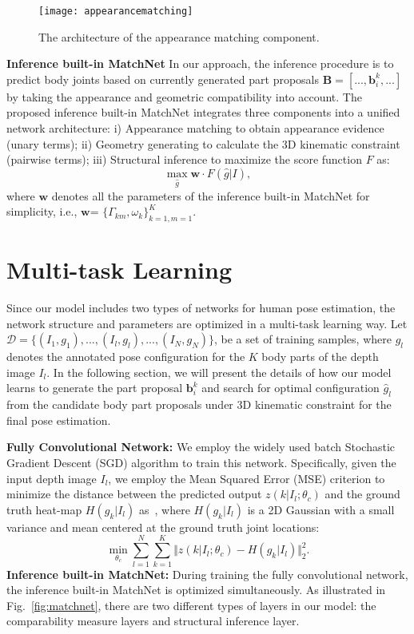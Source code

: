 \documentclass{sig-alternate-05-2015}
\begin{document}
\begin{figure*}[!htb]
\centering
\texttt{[image: appearancematching]}
\caption{The architecture of the appearance matching component.}\label{fig:amc}
\end{figure*} 

\textbf{Inference built-in MatchNet}
In our approach, the inference procedure is to predict body joints based on currently generated part proposals $\mathbf{B}=[..., \mathbf{b}_i^k, ...]$ by taking the appearance and geometric compatibility into account. The proposed inference built-in MatchNet integrates three components into a unified network architecture: i) Appearance matching to obtain appearance evidence (unary terms); ii) Geometry generating to calculate the 3D kinematic constraint (pairwise terms); iii) Structural inference to maximize the score function $F$ as: 
\begin{equation}
\max_{\hat{g}} \mathbf{w} \cdot F(\hat{g}|I),
\end{equation}
where $\mathbf{w}$ denotes all the parameters of the inference built-in MatchNet for simplicity, i.e., $\mathbf{w}$= $\{\Gamma_{km}, \omega_k\}_{k=1, m=1}^K$. 

 
\section{Multi-task Learning}
\label{sec:learn}
Since our model includes two types of networks for human pose estimation, the network structure and parameters are optimized in a multi-task learning way. Let $\mathcal{D}=\{(I_1, g_1), ...,  (I_l, g_l), ...,(I_N, g_N)\}$, be a set of training samples, where $g_l$ denotes the annotated pose configuration for the $K$ body parts of the depth image $I_l$. In the following section, we will present the details of how our model learns to generate the part proposal $\textbf{b}_i^k$ and search for optimal configuration $\hat{g}_l$ from the candidate body part proposals under 3D kinematic constraint for the final pose estimation. 

\textbf{Fully Convolutional Network:}
We employ the widely used batch Stochastic Gradient Descent (SGD) algorithm to train this network. Specifically, given the input depth image $I_l$, we employ the Mean Squared Error (MSE) criterion to minimize the distance between the predicted output $z(k|I_l;\theta_c)$ and the ground truth heat-map $H(g_k|I_l)$ as~\cite{cn15cvpr}, where $H(g_k|I_l)$ is a 2D Gaussian with a small variance and mean centered at the ground truth joint locations:   
\begin{equation}
\label{equ:heatmap}
\min_{\theta_c} \sum_{l=1}^N \sum_{k=1}^K \Vert z(k|I_l; \theta_c) - H(g_k|I_l) \Vert^2_2.
\end{equation}
\textbf{Inference built-in MatchNet:}
During training the fully convolutional network, the inference built-in MatchNet is optimized simultaneously. As illustrated in Fig.~\ref{fig:matchnet}, there are two different types of layers in our model: the comparability measure layers and structural inference layer.
\end{document}
